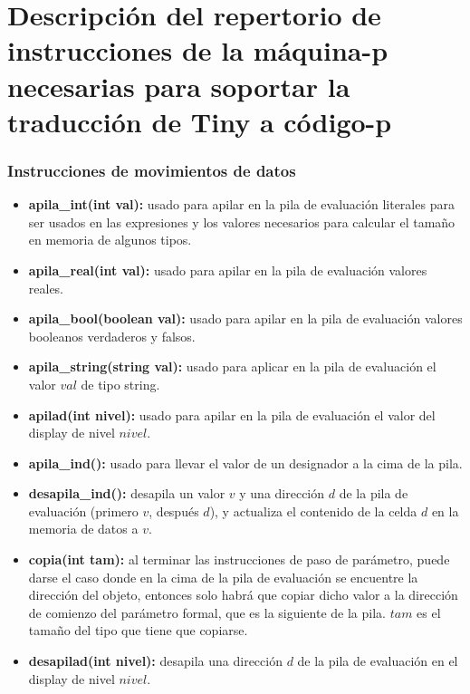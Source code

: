 \documentclass[11pt]{article}
\begin{document}
    \section{Descripción del repertorio de instrucciones de la máquina-p necesarias para soportar la traducción de Tiny a código-p}
        \subsubsection*{Instrucciones de movimientos de datos}
            \begin{itemize}
                \item \textbf{apila\_int(int val):} usado para apilar en la pila de evaluación literales para ser usados en las expresiones y los valores necesarios para calcular el tamaño en memoria de algunos tipos.
                \item \textbf{apila\_real(int val):} usado para apilar en la pila de evaluación valores reales.
                \item \textbf{apila\_bool(boolean val):} usado para apilar en la pila de evaluación valores booleanos verdaderos y falsos.
                \item \textbf{apila\_string(string val):} usado para aplicar en la pila de evaluación el valor $val$ de tipo string.
                \item \textbf{apilad(int nivel):} usado para apilar en la pila de evaluación el valor del display de nivel $nivel$.
                \item \textbf{apila\_ind():} usado para llevar el valor de un designador a la cima de la pila.
                \item \textbf{desapila\_ind():} desapila un valor $v$ y una dirección $d$ de la pila de evaluación (primero $v$, después $d$), y actualiza el contenido de la celda $d$ en la memoria de datos a $v$.
                \item \textbf{copia(int tam):} al terminar las instrucciones de paso de parámetro, puede darse el caso donde en la cima de la pila de evaluación se encuentre la dirección del objeto, entonces solo habrá que copiar dicho valor a la dirección de comienzo del parámetro formal, que es la siguiente de la pila. $tam$ es el tamaño del tipo que tiene que copiarse.
                \item \textbf{desapilad(int nivel):} desapila una dirección $d$ de la pila de evaluación en el display de nivel $nivel$.
            \end{itemize}
\end{document}
